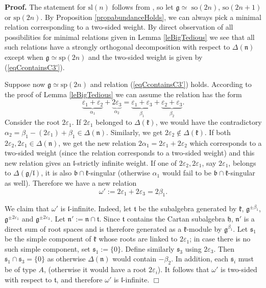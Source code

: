 \documentclass[12pt]{report}
\newenvironment{proof}[1][]{ \textbf{Proof#1. }}{$\Box$\medskip}
\newcommand{\sS}{\mathfrak{s}}
\newcommand{\tT}{\mathfrak{t}}
\newcommand{\kk}{\mathfrak{k}}
\newcommand{\nn}{\mathfrak{n}}
\newcommand{\hh}{\mathfrak{h}}
\newcommand{\gG}{\mathfrak{g}}
\newcommand{\bb}{\mathfrak{b}}
\newcommand{\lL}{\mathfrak{l}}
\newcommand{\refprop}[1]{Proposition \ref{#1}}
\newcommand{\refeq}[1]{(\ref{#1})}
\newcommand{\sL}{\mathrm{sl}}
\newcommand{\sP}{\mathrm{sp}}
\newcommand{\so}{\mathrm{so}}
\newcommand{\eps}{\varepsilon}
\newcommand{\pma}{\pm}%
\begin{document}
\begin{proof} 
The statement for $\sL(n)$ follows from \cite[Lemma 5.4]{PSZ}, so let $\gG\simeq$ $\so(2n)$, $\so(2n+1)$ or $\sP(2n)$. By \refprop{propabundanceHolds}, we can always pick a minimal relation corresponding to a two-sided weight. By direct observation of all possibilities for minimal relations given in Lemma \ref{leBigTedious} we see that all such relations have a strongly orthogonal decomposition with respect to $\Delta(\nn)$ except when $\gG\simeq\sP(2n)$ and the two-sided weight is given by \refeq{eqCcontainsC3'}. 

Suppose now $\gG\simeq\sP(2n)$ and relation \refeq{eqCcontainsC3'} holds. According to the proof of Lemma \ref{leBigTedious} we can assume the relation has the form
\[
\underbrace{\eps_{1}+\eps_{2}}_{\alpha_1}+ \underbrace{2\eps_{3}}_{\alpha_2} = \underbrace{ \eps_{1}+ \eps_{3}}_{\beta_{1}}+\underbrace{\eps_{2}+ \eps_{3} }_{\beta_{2}}.
\]
Consider the root $2\eps_{1}$. If $2 \eps_{1}$ belonged to $\Delta(\kk)$, we would have the contradictory $\alpha_2=\beta_1- (2 \eps_{1})+\beta_1\in\Delta(\nn)$. Similarly, we get $2\eps_{2} \notin \Delta (\kk)$. If both $2\eps_{2}, 2\eps_{1} \in\Delta(\nn)$, we get the new relation $2\alpha_1=2\eps_{1}+2\eps_{2}$ which corresponds to a two-sided weight (since the relation corresponds to a two-sided weight) and this new relation gives an $\lL$-strictly infinite weight. If one of $2\eps_{2}, 2\eps_{1}$, say $2\eps_{1}$, belongs to $\Delta(\gG/\lL)$, it is also $\bb\cap\kk$-singular (otherwise $\alpha_1$ would fail to be $\bb\cap\kk$-singular as well). Therefore we have a new relation 
\begin{equation}
\label{eqSoProblem}\omega':= 2\eps_{1}+ 2{\eps_{3}}=2\beta_1. 
\end{equation}  

We claim that $\omega'$ is $\lL$-infinite. Indeed, let $\tT$ be the subalgebra generated by $\kk$, $\gG^{\pma \beta_1}$, $\gG^{\pma 2\eps_{1}}$ and $\gG^{\pma 2\eps_{3}}$. Let $\nn ':=\nn\cap\tT$. Since $\tT$ contains the Cartan subalgebra $\hh$, $\nn '$ is a direct sum of root spaces and is therefore generated as a $\kk$-module by $\gG^{ \beta_1}$. Let $\sS_1$ be the simple component of $\kk$ whose roots are linked to $2\eps_{1}$; in case there is no such simple component, set $\sS_1:=\{0\}$. Define similarly $\sS_3$ using $2\eps_3$. Then $\sS_1\cap\sS_3=\{0\}$ as otherwise $\Delta(\nn)$ would contain $-\beta_2$. In addition, each $\sS_i$ must be of type $A$, (otherwise it would have a root $2\eps_{i}$). It follows that $\omega'$ is two-sided with respect to $\tT$, and therefore $\omega'$ is $\lL$-infinite.
\end{proof}
\end{document}
